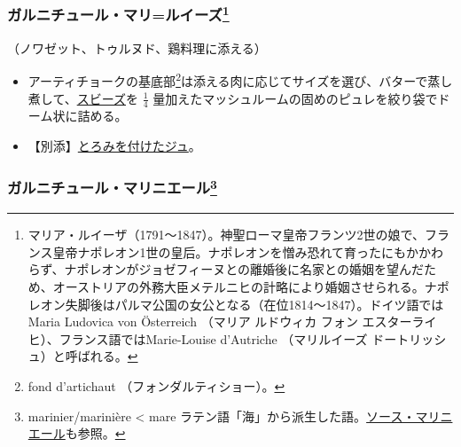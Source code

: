 \begin{recette}
\atoaki{}

\hypertarget{garniture-marie-louise}{%
\subsubsection[ガルニチュール・マリ=ルイーズ]{\texorpdfstring{ガルニチュール・マリ=ルイーズ\footnote{マリア・ルイーザ（1791〜1847）。神聖ローマ皇帝フランツ2世の娘で、フランス皇帝ナポレオン1世の皇后。ナポレオンを憎み恐れて育ったにもかかわらず、ナポレオンがジョゼフィーヌとの離婚後に名家との婚姻を望んだため、オーストリアの外務大臣メテルニヒの計略により婚姻させられる。ナポレオン失脚後はパルマ公国の女公となる（在位1814〜1847）。ドイツ語ではMaria
  Ludovica von Österreich （マリア ルドウィカ フォン
  エスターライヒ）、フランス語ではMarie-Louise d'Autriche （マリルイーズ
  ドートリッシュ）と呼ばれる。}}{ガルニチュール・マリ=ルイーズ}}\label{garniture-marie-louise}}



（ノワゼット、トゥルヌド、鶏料理に添える）

\begin{itemize}
\item
  アーティチョークの基底部\footnote{fond d'artichaut
    （フォンダルティショー）。}は添える肉に応じてサイズを選び、バターで蒸し煮して、\protect\hyperlink{sauce-soubise}{スビーズ}を
  \(\frac{1}{4}\)
  量加えたマッシュルームの固めのピュレを絞り袋でドーム状に詰める。
\item
  【別添】\protect\hyperlink{jus-de-veau-lie}{とろみを付けたジュ}。
\end{itemize}

\atoaki{}

\hypertarget{garniture-marniere}{%
\subsubsection[ガルニチュール・マリニエール]{\texorpdfstring{ガルニチュール・マリニエール\footnote{marinier/marinière
  \textless{} mare
  ラテン語「海」から派生した語。\protect\hyperlink{sauce-mariniere}{ソース・マリニエール}も参照。}}{ガルニチュール・マリニエール}}\label{garniture-marniere}}



\end{recette}
